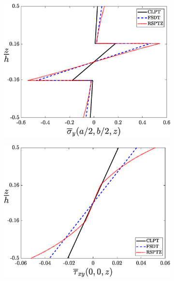 \documentclass{article}
\begin{document}
\begin{figure}[!]
        \begin{subfigure}{0.5\textwidth}
            \includegraphics[width=1\linewidth, height=0.8\linewidth]{figures/sigma__yy_bar.eps} 
            \caption{}
            \label{fig:sigma__yy_bar}
        \end{subfigure}
        \begin{subfigure}{0.5\textwidth}
            \includegraphics[width=1\linewidth, height=0.8\linewidth]{figures/tau__xy_bar.eps} 
            \caption{}
            \label{fig:tau__xy_bar}
        \end{subfigure}
    

\end{figure}
\end{document}
